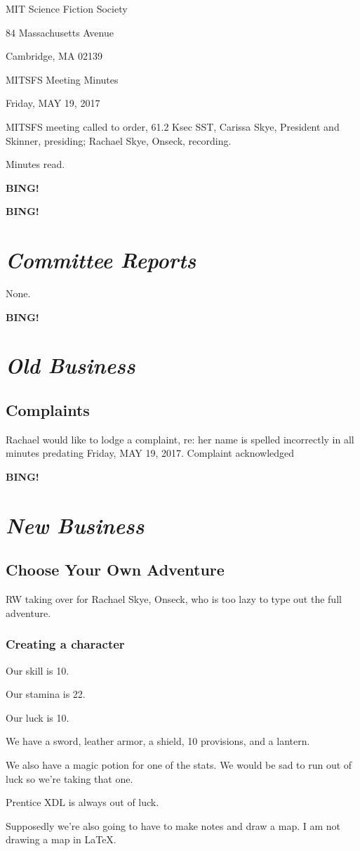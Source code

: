 \documentclass[10pt]{article}
\newcommand{\bing}{{\bf BING!} }
\newcommand{\goto}[1]{\bing \vskip 12pt \section*{{\em{#1}}}}
\newcommand{\skinner}{Carissa Skye, President and Skinner}
\newcommand{\onseck}{Rachael Skye, Onseck}
\newcommand{\meetingdate}{Friday, MAY 19, 2017}
\begin{document}
\begin{center}

MIT Science Fiction Society

84 Massachusetts Avenue

Cambridge, MA 02139

\vspace{12pt}

MITSFS Meeting Minutes

\meetingdate

\end{center}

\vspace{18pt}

\setlength{\parskip}{6pt}

\noindent
MITSFS meeting called to order, 61.2 Ksec SST,
\skinner, presiding; \onseck, recording.

Minutes read.

\bing

\goto{Committee Reports}

None.

\goto{Old Business}

\subsection*{Complaints}
Rachael would like to lodge a complaint, re: her name is spelled incorrectly in all minutes predating \meetingdate.
Complaint acknowledged

\goto{New Business}

\subsection*{Choose Your Own Adventure}
RW taking over for \onseck, who is too lazy to type out the full adventure.
\subsubsection*{Creating a character}
Our skill is 10.

Our stamina is 22.

Our luck is 10.

We have a sword, leather armor, a shield, 10 provisions, and a lantern.

We also have a magic potion for one of the stats.  We would be sad to run out of luck so we're taking that one.

Prentice XDL is always out of luck.

Supposedly we're also going to have to make notes and draw a map.  I am not drawing a map in \LaTeX.
\end{document}
